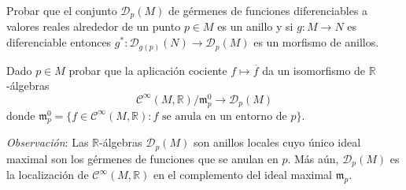 \documentclass[12pt, a4paper]{amsart}
\theoremstyle{definition}
\newcommand{\RR}{\mathbb{R}}      %
\begin{document}
\begin{question}
Probar que el conjunto $\mathscr{D}_p(M)$ de gérmenes de funciones diferenciables a valores reales alrededor de un punto $p\in M$ es un anillo y si $g:M\to N$ es diferenciable entonces $g^*:\mathscr{D}_{g(p)}(N)\to\mathscr{D}_p(M)$ es un morfismo de anillos.
\end{question}

\begin{question}
Dado $p\in M$ probar que la aplicación cociente $f\mapsto\overline{f}$ da un isomorfismo de $\RR$-álgebras $$\mathscr{C}^\infty(M,\RR)/\mathfrak{m}_p^0\to\mathscr{D}_p(M)$$ donde $\mathfrak{m}_p^0 = \{f\in\mathscr{C}^\infty(M,\RR): f \text{ se anula en un entorno de } p\}$.
\vspace{1em}

\noindent\textit{Observación}: Las $\RR$-álgebras $\mathscr{D}_p(M)$ son anillos locales cuyo único ideal maximal son los gérmenes de funciones que se anulan en $p$. Más aún, $\mathscr{D}_p(M)$ es la localización de $\mathscr{C}^\infty(M,\RR)$ en el complemento del ideal maximal $\mathfrak{m}_p$.
\end{question}
\end{document}
